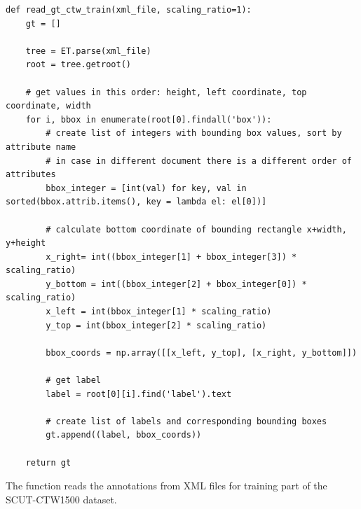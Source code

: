 \begin{lstlisting}[caption=read\_gt\_ctw\_train]
def read_gt_ctw_train(xml_file, scaling_ratio=1):
    gt = []

    tree = ET.parse(xml_file)
    root = tree.getroot()

    # get values in this order: height, left coordinate, top coordinate, width
    for i, bbox in enumerate(root[0].findall('box')):
        # create list of integers with bounding box values, sort by attribute name
        # in case in different document there is a different order of attributes
        bbox_integer = [int(val) for key, val in sorted(bbox.attrib.items(), key = lambda el: el[0])]
        
        # calculate bottom coordinate of bounding rectangle x+width, y+height
        x_right= int((bbox_integer[1] + bbox_integer[3]) * scaling_ratio)
        y_bottom = int((bbox_integer[2] + bbox_integer[0]) * scaling_ratio)
        x_left = int(bbox_integer[1] * scaling_ratio)
        y_top = int(bbox_integer[2] * scaling_ratio)

        bbox_coords = np.array([[x_left, y_top], [x_right, y_bottom]])

        # get label
        label = root[0][i].find('label').text

        # create list of labels and corresponding bounding boxes
        gt.append((label, bbox_coords))

    return gt
\end{lstlisting}

The function  reads the annotations from  XML files for training part of the SCUT-CTW1500 dataset.

